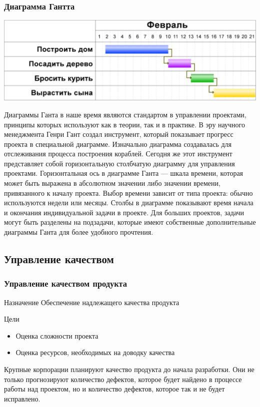 \documentclass{../industrial-development}
\begin{document}
\begin{frame} \frametitle{Диаграмма Гантта}
	\centerline{\includegraphics[width=1\textwidth]{gantt.pdf}}
\end{frame}
\lecturenotes
Диаграммы Ганта в наше время являются стандартом в управлении проектами, принципы которых используют как в теории, так и в практике.
В эру научного менеджмента Генри Гант создал инструмент, который показывает прогресс проекта в специальной диаграмме. Изначально диаграмма создавалась для отслеживания процесса построения кораблей. Сегодня же этот инструмент представляет собой горизонтальную столбчатую диаграмму для управления проектами.
Горизонтальная ось в диаграмме Ганта — шкала времени, которая может быть выражена в абсолютном значении либо значении времени, привязанного к началу проекта. Выбор времени зависит от типа проекта: обычно используются недели или месяцы. Столбы в диаграмме показывают время начала и окончания индивидуальной задачи в проекте.
Для больших проектов, задачи могут быть разделены на подзадачи, которые имеют собственные дополнительные диаграммы Ганта для более удобного прочтения.

\subsection{Управление качеством}

\begin{frame} \frametitle{Управление качеством продукта}
	\begin{block}{Назначение}
		Обеспечение надлежащего качества продукта
	\end{block}
	Цели
	\begin{itemize}
		\item Оценка сложности проекта
		\item Оценка ресурсов, необходимых на доводку качества
	\end{itemize}
\end{frame}
\lecturenotes
Крупные корпорации планируют качество продукта до начала разработки. Они не только прогнозируют количество дефектов, которое будет найдено в процессе работы над проектом, но и количество дефектов, которое так и не будет исправлено.
\end{document}
